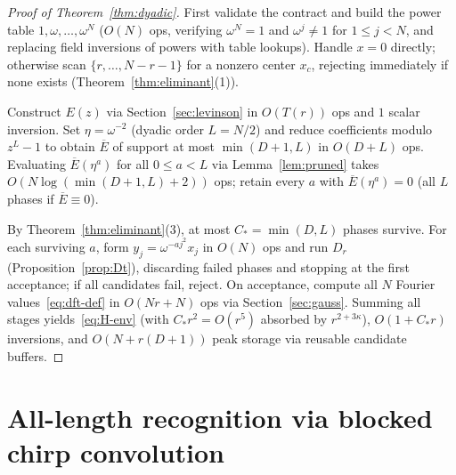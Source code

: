 \documentclass[11pt,reqno]{amsart}
\numberwithin{equation}{section}
\theoremstyle{definition}
\theoremstyle{remark}
\begin{document}
\begin{proof}[Proof of Theorem~\ref{thm:dyadic}]
First validate the contract and build the power table $1,\omega,\ldots,\omega^N$ ($O(N)$ ops, verifying $\omega^N=1$ and $\omega^j\neq 1$ for $1\le j<N$, and replacing field inversions of powers with table lookups). Handle $x=0$ directly; otherwise scan $\{r,\ldots,N-r-1\}$ for a nonzero center $x_c$, rejecting immediately if none exists (Theorem~\ref{thm:eliminant}(1)).

Construct $E(z)$ via Section~\ref{sec:levinson} in $O(T(r))$ ops and $1$ scalar inversion. Set $\eta = \omega^{-2}$ (dyadic order $L = N/2$) and reduce coefficients modulo $z^L - 1$ to obtain $\overline{E}$ of support at most $\min(D+1,L)$ in $O(D+L)$ ops. Evaluating $\overline{E}(\eta^a)$ for all $0\le a<L$ via Lemma~\ref{lem:pruned} takes $O(N\log(\min(D+1,L)+2))$ ops; retain every $a$ with $\overline{E}(\eta^a)=0$ (all $L$ phases if $\overline{E}\equiv 0$).

By Theorem~\ref{thm:eliminant}(3), at most $C_* = \min(D,L)$ phases survive. For each surviving $a$, form $y_j = \omega^{-aj^2}x_j$ in $O(N)$ ops and run $D_r$ (Proposition~\ref{prop:Dt}), discarding failed phases and stopping at the first acceptance; if all candidates fail, reject. On acceptance, compute all $N$ Fourier values~\eqref{eq:dft-def} in $O(Nr + N)$ ops via Section~\ref{sec:gauss}. Summing all stages yields~\eqref{eq:H-env} (with $C_*r^2 = O(r^5)$ absorbed by $r^{2+3\kappa}$), $O(1+C_*r)$ inversions, and $O(N+r(D+1))$ peak storage via reusable candidate buffers.
\end{proof}

\section{All-length recognition via blocked chirp convolution}
\label{sec:all-length}
\end{document}
